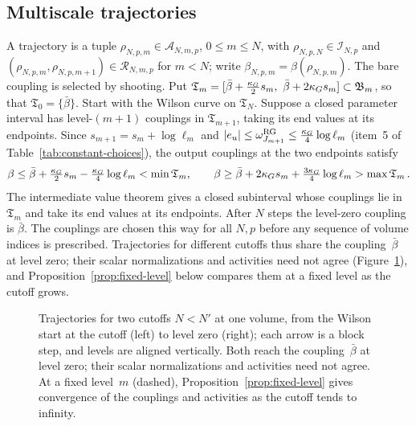 \subsection{Multiscale trajectories}\label{sec:trajectories}

A trajectory is a tuple $\rho_{N,p,m}\in\mathcal A_{N,m,p}$, $0\le m\le N$, with $\rho_{N,p,N}\in\mathcal I_{N,p}$ and $(\rho_{N,p,m},\rho_{N,p,m+1})\in\mathcal R_{N,m,p}$ for $m<N$; write $\beta_{N,p,m}=\beta(\rho_{N,p,m})$. The bare coupling is selected by shooting. Put $\mathfrak T_m=[\bar\beta+\tfrac{\slope}2s_m,\ \bar\beta+2\slope s_m]\subset\mathfrak B_m$, so that $\mathfrak T_0=\{\bar\beta\}$. Start with the Wilson curve on $\mathfrak T_N$. Suppose a closed parameter interval has level-$(m+1)$ couplings in $\mathfrak T_{m+1}$, taking its end values at its endpoints. Since $s_{m+1}=s_m+\log\ell_m$ and $|e_u|\le\omega^{\rm RG}_{J_{m+1}}\le\tfrac{\kappa_G}4\log\ell_m$ (item~5 of Table~\ref{tab:constant-choices}), the output couplings at the two endpoints satisfy
\begin{equation*}
\beta\le\bar\beta+\tfrac{\kappa_G}2s_m-\tfrac{\kappa_G}4\log\ell_m<\min\mathfrak T_m,\qquad
\beta\ge\bar\beta+2\kappa_G s_m+\tfrac{3\kappa_G}4\log\ell_m>\max\mathfrak T_m\,.
\end{equation*}
The intermediate value theorem gives a closed subinterval whose couplings lie in $\mathfrak T_m$ and take its end values at its endpoints. After $N$ steps the level-zero coupling is $\bar\beta$. The couplings are chosen this way for all $N,p$ before any sequence of volume indices is prescribed. Trajectories for different cutoffs thus share the coupling~$\bar\beta$ at level zero; their scalar normalizations and activities need not agree (Figure~\ref{fig:two-cutoffs}), and Proposition~\ref{prop:fixed-level} below compares them at a fixed level as the cutoff grows.

\begin{figure}[ht]
\centering
{}
\caption{Trajectories for two cutoffs $N<N'$ at one volume, from the Wilson start at the cutoff (left) to level zero (right); each arrow is a block step, and levels are aligned vertically. Both reach the coupling~$\bar\beta$ at level zero; their scalar normalizations and activities need not agree. At a fixed level~$m$ (dashed), Proposition~\ref{prop:fixed-level} gives convergence of the couplings and activities as the cutoff tends to infinity.}\label{fig:two-cutoffs}
\end{figure}

